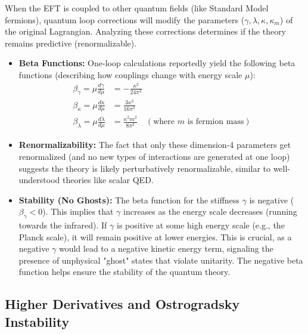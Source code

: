 \documentclass[11pt]{article}
\begin{document}
When the EFT is coupled to other quantum fields (like Standard Model fermions), quantum loop corrections will modify the parameters ($\gamma, \lambda, \kappa, \kappa_m$) of the original Lagrangian. Analyzing these corrections determines if the theory remains predictive (renormalizable).
\begin{itemize}
    \item \textbf{Beta Functions:} One-loop calculations reportedly yield the following beta functions (describing how couplings change with energy scale $\mu$):
        \begin{align*}
        \beta_\gamma = \mu \frac{d\gamma}{d\mu} &= -\frac{\kappa^2}{24\pi^2} \\
        \beta_\kappa = \mu \frac{d\kappa}{d\mu} &= \frac{3\kappa^3}{16\pi^2} \\
        \beta_{\lambda} = \mu \frac{d\lambda}{d\mu} &= \frac{\kappa^2 m^2}{8\pi^2} \quad (\text{where } m \text{ is fermion mass})
        \end{align*}
    \item \textbf{Renormalizability:} The fact that only these dimension-4 parameters get renormalized (and no new types of interactions are generated at one loop) suggests the theory is likely perturbatively renormalizable, similar to well-understood theories like scalar QED.
    \item \textbf{Stability (No Ghosts):} The beta function for the stiffness $\gamma$ is negative ($\beta_\gamma < 0$). This implies that $\gamma$ increases as the energy scale decreases (running towards the infrared). If $\gamma$ is positive at some high energy scale (e.g., the Planck scale), it will remain positive at lower energies. This is crucial, as a negative $\gamma$ would lead to a negative kinetic energy term, signaling the presence of unphysical "ghost" states that violate unitarity. The negative beta function helps ensure the stability of the quantum theory.
\end{itemize}

\subsection{Higher Derivatives and Ostrogradsky Instability}
\end{document}
